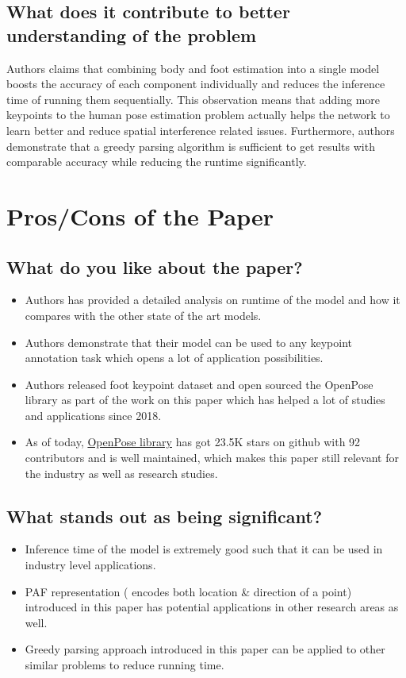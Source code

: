 \documentclass[twocolumn]{article}
\begin{document}
\subsection{What does it contribute to better understanding of the problem}
Authors claims that combining body and foot estimation into a single model boosts the accuracy of each
component individually and reduces the inference time of running them sequentially. This observation means that adding more keypoints to the human pose estimation problem actually helps the network to learn better and reduce spatial interference related issues. Furthermore, authors demonstrate that a greedy parsing algorithm is sufficient to get results with comparable accuracy while reducing the runtime significantly.


\section{Pros/Cons of the Paper}

\subsection{What do you like about the paper?}
\begin{itemize}
	\item Authors has provided a detailed analysis on runtime of the model and how it compares with the other state of the art models.
	\item Authors demonstrate that their model can be used to any keypoint annotation task which opens a lot of application possibilities.
	\item Authors released foot keypoint dataset  and open sourced the OpenPose library as part of the work on this paper which has helped a lot of studies and applications since 2018.
	\item As of today, \href{https://github.com/CMU-Perceptual-Computing-Lab/openpose}{OpenPose library} has got 23.5K stars on github with 92 contributors and is well maintained, which makes this paper still relevant for the industry as well as research studies.
\end{itemize}

\subsection{What stands out as being significant?}
\begin{itemize}
	\item Inference time of the model is extremely good such that it can be used in industry level applications.
	\item PAF representation ( encodes both location \& direction of a point) introduced in this paper has potential applications in other research areas as well.
	\item Greedy parsing approach introduced in this paper can be applied to other similar problems to reduce running time.
\end{itemize}
\end{document}
